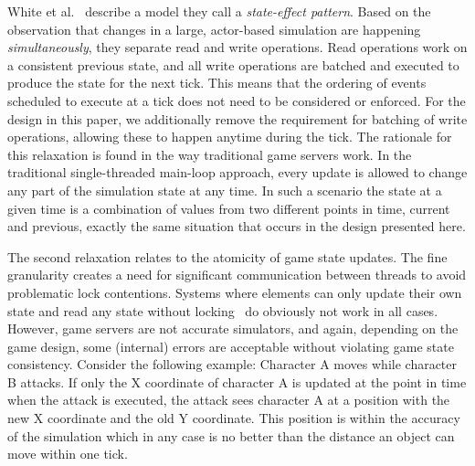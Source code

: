 White et al.~\cite{white++2008} describe a model they call a 
\textit{state-effect pattern}. Based on the observation that changes in a large, actor-based simulation are happening \textit{simultaneously}, they separate read and write operations. Read operations work on a consistent previous state, and all write operations are batched and executed to produce the state for the next tick. This means that the ordering of events scheduled to execute at a tick does not need to be considered or enforced. 
For the design in this paper, we additionally remove the requirement for batching of write operations, allowing these to happen anytime during the tick. The rationale for this relaxation is found in the way traditional game servers work. In the traditional single-threaded main-loop approach, every update is allowed to change any part of the simulation state at any time. In such a scenario the state at a given time is a combination of values from two different points in time, current and previous, exactly the same situation that occurs in the design presented here.
%

The second relaxation relates to the atomicity of game state updates. The fine
granularity creates a need for significant communication between threads
to avoid problematic lock contentions. Systems where
%
elements can only update their own state and read any state
without locking~\cite{Abdelkhalek2004++}
%
do obviously not work in all cases. However, game servers are not
accurate simulators, and again, depending on the game design, some
(internal) errors are acceptable without violating game state
consistency. 
Consider
the following example: Character A moves while character B attacks. If
only the X coordinate of character A is updated at the point in time
when the attack is executed, the attack sees character A at a position with the new X coordinate and the old Y coordinate.  This position is within the accuracy of the
simulation which in any case is no better than the distance an object
can move within one tick. 

